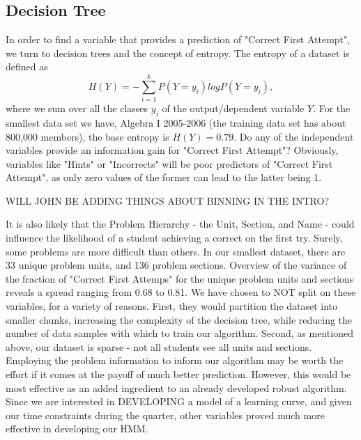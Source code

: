 \documentclass{article} %
\begin{document}
\subsection{Decision Tree}
In order to find a variable that provides a prediction of "Correct First Attempt", we turn to decision trees and the concept of entropy. The entropy of a dataset is defined as
$$
H(Y) = -\sum_{i=1}^k P(Y = y_i) log P(Y = y_i),
$$
where we sum over all the classes $y_i$ of the output/dependent variable $Y$. For the smallest data set we have, Algebra I 2005-2006 (the training data set has about 800,000 members), the base entropy is $H(Y) = 0.79$. Do any of the independent variables provide an information gain for "Correct First Attempt"? Obviously, variables like "Hints" or "Incorrects" will be poor predictors of "Correct First Attempt", as only zero values of the former can lead to the latter being 1.

WILL JOHN BE ADDING THINGS ABOUT BINNING IN THE INTRO?

It is also likely that the Problem Hierarchy - the Unit, Section, and Name - could influence the likelihood of a student achieving a correct on the first try. Surely, some problems are more difficult than others. In our smallest dataset, there are 33 unique problem units, and 136 problem sections. Overview of the variance of the fraction of "Correct First Attemps" for the unique problem units and sections reveals a spread ranging from 0.68 to 0.81. We have chosen to NOT split on these variables, for a variety of reasons. First, they would partition the dataset into smaller chunks, increasing the complexity of the decision tree, while reducing the number of data samples with which to train our algorithm. Second, as mentioned above, our dataset is sparse - not all students see all units and sections. Employing the problem information to inform our algorithm may be worth the effort if it comes at the payoff of much better prediction. However, this would be most effective as an added ingredient to an already developed robust algorithm. Since we are interested in DEVELOPING a model of a learning curve, and given our time constraints during the quarter, other variables proved much more effective in developing our HMM.
\end{document}
